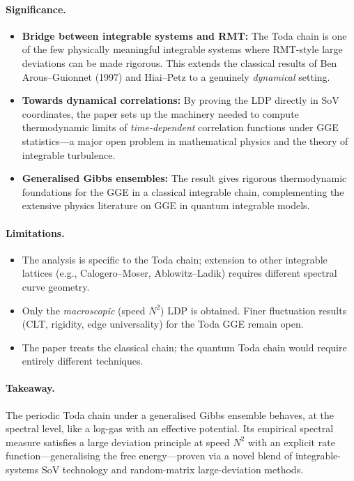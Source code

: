 \documentclass[11pt,a4paper]{article}
\theoremstyle{remark}
\begin{document}
\paragraph{Significance.}
\begin{itemize}[nosep]
  \item \textbf{Bridge between integrable systems and RMT:} The Toda chain is one of the few physically meaningful integrable systems where RMT-style large deviations can be made rigorous.  This extends the classical results of Ben Arous--Guionnet (1997) and Hiai--Petz to a genuinely \emph{dynamical} setting.
  \item \textbf{Towards dynamical correlations:} By proving the LDP directly in SoV coordinates, the paper sets up the machinery needed to compute thermodynamic limits of \emph{time-dependent} correlation functions under GGE statistics---a major open problem in mathematical physics and the theory of integrable turbulence.
  \item \textbf{Generalised Gibbs ensembles:} The result gives rigorous thermodynamic foundations for the GGE in a classical integrable chain, complementing the extensive physics literature on GGE in quantum integrable models.
\end{itemize}

\paragraph{Limitations.}
\begin{itemize}[nosep]
  \item The analysis is specific to the Toda chain; extension to other integrable lattices (e.g., Calogero--Moser, Ablowitz--Ladik) requires different spectral curve geometry.
  \item Only the \emph{macroscopic} (speed $N^2$) LDP is obtained.  Finer fluctuation results (CLT, rigidity, edge universality) for the Toda GGE remain open.
  \item The paper treats the classical chain; the quantum Toda chain would require entirely different techniques.
\end{itemize}

\paragraph{Takeaway.}
The periodic Toda chain under a generalised Gibbs ensemble behaves, at the spectral level, like a log-gas with an effective potential.  Its empirical spectral measure satisfies a large deviation principle at speed $N^2$ with an explicit rate function---generalising the free energy---proven via a novel blend of integrable-systems SoV technology and random-matrix large-deviation methods.
\end{document}
